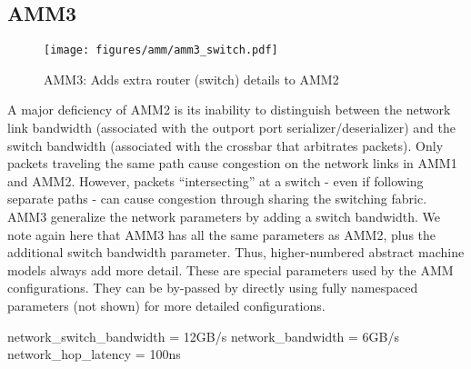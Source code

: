 \subsection{AMM3}
\label{subsec:ammThree}

\begin{figure}
\begin{center}
\texttt{[image: figures/amm/amm3\_switch.pdf]}
\end{center}
\caption{AMM3: Adds extra router (switch) details to AMM2}
\label{fig:amm3}
\end{figure}

A major deficiency of AMM2 is its inability to distinguish between the network link bandwidth (associated with the outport port serializer/deserializer) and the switch bandwidth (associated with the crossbar that arbitrates packets).  
Only packets traveling the same path cause congestion on the network links in AMM1 and AMM2.
However, packets ``intersecting'' at a switch - even if following separate paths - can cause congestion through sharing the switching fabric.
AMM3 generalize the network parameters by adding a switch bandwidth.
We note again here that AMM3 has all the same parameters as AMM2, plus the additional switch bandwidth parameter.
Thus, higher-numbered abstract machine models always add more detail.
These are special parameters used by the AMM configurations.
They can be by-passed by directly using fully namespaced parameters (not shown) for more detailed configurations.

\begin{ViFile}
network_switch_bandwidth = 12GB/s
network_bandwidth = 6GB/s
network_hop_latency = 100ns
\end{ViFile}
